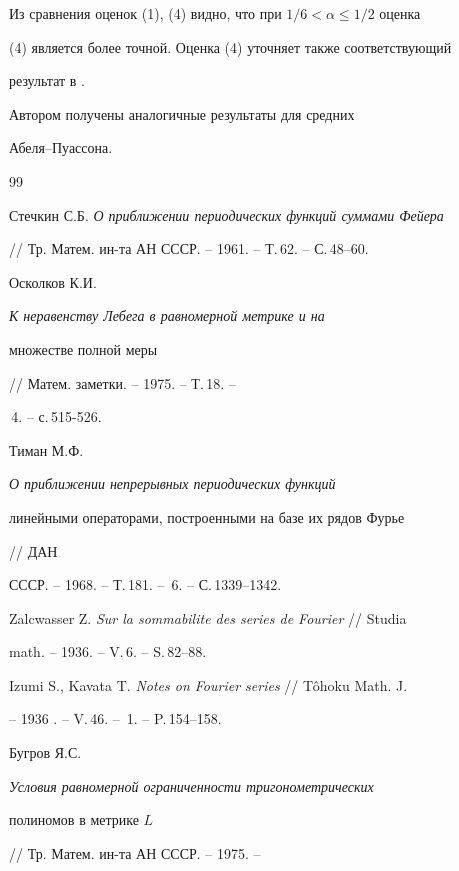 Из сравнения оценок (1), (4) видно, что при $1/6<\alpha\le 1/2$ оценка


(4) является более точной. Оценка (4) уточняет также соответствующий


результат в \cite{8}.





Автором получены аналогичные результаты для средних


Абеля--Пуассона.








\begin{thebibliography}{99}







Стечкин С.Б. {\em О приближении периодических функций суммами Фейера}


// Тр. Матем. ин-та АН СССР. -- 1961. -- Т.\,62. -- С.\,48--60.




Осколков К.И. {\em К неравенству Лебега в равномерной метрике и на


множестве полной меры} // Матем. заметки. -- 1975. -- Т.\,18. --


\No\,4. -- с.\,515-526.




Тиман М.Ф. {\em О приближении непрерывных периодических функций


линейными операторами, построенными на базе их рядов Фурье} // ДАН


СССР. -- 1968. -- Т.\,181. -- \No\,6. -- С.\,1339--1342.




Zalcwasser Z. {\em Sur la sommabilite des series de Fourier} // Studia


math. -- 1936. -- V.\,6. -- S.\,82--88.




Izumi S., Kavata T. {\em Notes on Fourier series} // T\^ohoku Math. J.


-- 1936 . -- V.\,46. -- \No\,1. -- P.\,154--158.




Бугров Я.С. {\em Условия равномерной ограниченности тригонометрических


полиномов в метрике $L$} // Тр. Матем. ин-та АН СССР. -- 1975. --



\end{thebibliography}
